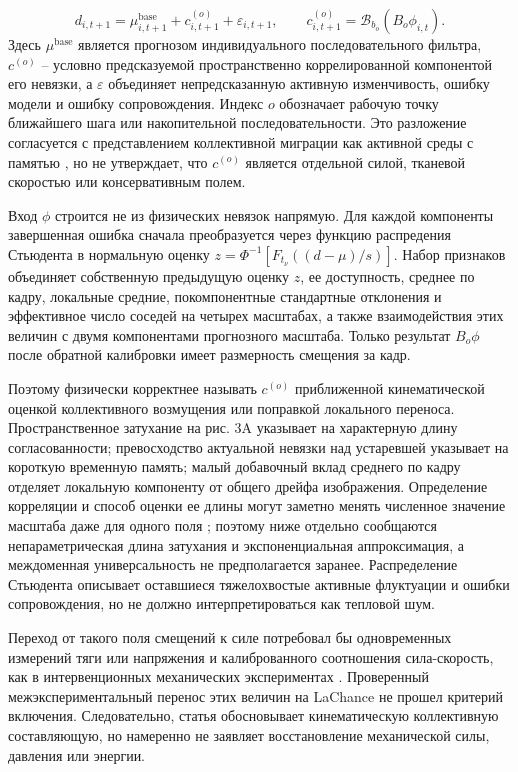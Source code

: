 \documentclass[11pt,a4paper]{article}
\begin{document}
\begin{equation}
d_{i,t+1}
=
\mu^{\mathrm{base}}_{i,t+1}
+c^{(o)}_{i,t+1}
+\varepsilon_{i,t+1},
\qquad
c^{(o)}_{i,t+1}
=
\mathcal B_{b_o}\!\left(B_o\phi_{i,t}\right).
\end{equation}
Здесь $\mu^{\mathrm{base}}$ является прогнозом индивидуального последовательного фильтра, $c^{(o)}$ -- условно предсказуемой пространственно коррелированной компонентой его невязки, а $\varepsilon$ объединяет непредсказанную активную изменчивость, ошибку модели и ошибку сопровождения. Индекс $o$ обозначает рабочую точку ближайшего шага или накопительной последовательности. Это разложение согласуется с представлением коллективной миграции как активной среды с памятью \cite{ref2,ref3,ref4}, но не утверждает, что $c^{(o)}$ является отдельной силой, тканевой скоростью или консервативным полем.

Вход $\phi$ строится не из физических невязок напрямую. Для каждой компоненты завершенная ошибка сначала преобразуется через функцию распредения Стьюдента в нормальную оценку $z=\Phi^{-1}[F_{t_\nu}((d-\mu)/s)]$. Набор признаков объединяет собственную предыдущую оценку $z$, ее доступность, среднее по кадру, локальные средние, покомпонентные стандартные отклонения и эффективное число соседей на четырех масштабах, а также взаимодействия этих величин с двумя компонентами прогнозного масштаба. Только результат $B_o\phi$ после обратной калибровки имеет размерность смещения за кадр.

Поэтому физически корректнее называть $c^{(o)}$ приближенной кинематической оценкой коллективного возмущения или поправкой локального переноса. Пространственное затухание на рис. 3A указывает на характерную длину согласованности; превосходство актуальной невязки над устаревшей указывает на короткую временную память; малый добавочный вклад среднего по кадру отделяет локальную компоненту от общего дрейфа изображения. Определение корреляции и способ оценки ее длины могут заметно менять численное значение масштаба даже для одного поля \cite{ref31}; поэтому ниже отдельно сообщаются непараметрическая длина затухания и экспоненциальная аппроксимация, а междоменная универсальность не предполагается заранее. Распределение Стьюдента описывает оставшиеся тяжелохвостые активные флуктуации и ошибки сопровождения, но не должно интерпретироваться как тепловой шум.

Переход от такого поля смещений к силе потребовал бы одновременных измерений тяги или напряжения и калиброванного соотношения сила-скорость, как в интервенционных механических экспериментах \cite{ref3,ref4,ref24}. Проверенный межэкспериментальный перенос этих величин на LaChance не прошел критерий включения. Следовательно, статья обосновывает кинематическую коллективную составляющую, но намеренно не заявляет восстановление механической силы, давления или энергии.
\end{document}
